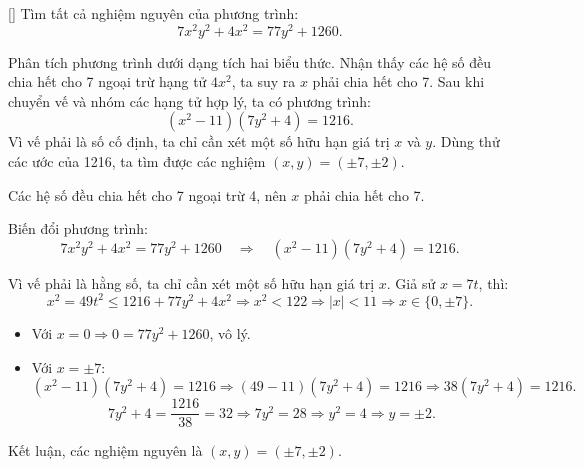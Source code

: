 \documentclass[../04-diophantine-equations.tex]{subfiles}
\begin{document}
\begin{example*}\label{example:CAN-2015-QRC-P1}[\textbf{}]
	Tìm tất cả nghiệm nguyên của phương trình:
	\[
		7x^2y^2 + 4x^2 = 77y^2 + 1260.
	\]	
\end{example*}

\begin{story*}
    Phân tích phương trình dưới dạng tích hai biểu thức. Nhận thấy các hệ số đều chia hết cho 7 ngoại trừ hạng tử \( 4x^2 \), ta suy ra \( x \) phải chia hết cho 7.  
    Sau khi chuyển vế và nhóm các hạng tử hợp lý, ta có phương trình:
    \[
        (x^2 - 11)(7y^2 + 4) = 1216.
    \]
    Vì vế phải là số cố định, ta chỉ cần xét một số hữu hạn giá trị \( x \) và \( y \). Dùng thử các ước của 1216, ta tìm được các nghiệm \((x, y) = (\pm 7, \pm 2)\).
\end{story*}

\begin{soln}\footnotemark
    Các hệ số đều chia hết cho 7 ngoại trừ 4, nên \( x \) phải chia hết cho 7.

    Biến đổi phương trình:
    \[
        7x^2y^2 + 4x^2 = 77y^2 + 1260
        \quad \Rightarrow \quad
        (x^2 - 11)(7y^2 + 4) = 1216.
    \]
    
    Vì vế phải là hằng số, ta chỉ cần xét một số hữu hạn giá trị \( x \). Giả sử \( x = 7t \), thì:
    \[
        x^2 = 49t^2 \leq 1216 + 77y^2 + 4x^2 \Rightarrow x^2 < 122 \Rightarrow |x| < 11 \Rightarrow x \in \{0, \pm7\}.
    \]

    \begin{itemize}[topsep=0pt, partopsep=0pt, itemsep=0pt]
        \item Với \( x = 0 \Rightarrow 0 = 77y^2 + 1260 \), vô lý.
        \item Với \( x = \pm7 \):
        \[
            (x^2 - 11)(7y^2 + 4) = 1216 \Rightarrow (49 - 11)(7y^2 + 4) = 1216 \Rightarrow 38(7y^2 + 4) = 1216.
        \]
        \[
            7y^2 + 4 = \frac{1216}{38} = 32 \Rightarrow 7y^2 = 28 \Rightarrow y^2 = 4 \Rightarrow y = \pm2.
        \]
    \end{itemize}

    Kết luận, các nghiệm nguyên là \( (x, y) = (\pm 7, \pm 2) \).
\end{soln}

\end{document}
